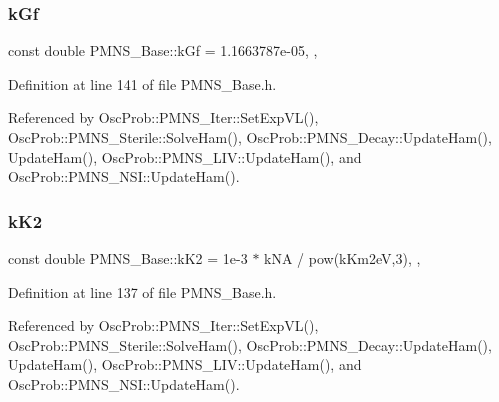 \mbox{\label{classOscProb_1_1PMNS__Base_a7f26a3456128234b2ae6cc9141a6532f}} 
\subsubsection{\texorpdfstring{k\+Gf}{kGf}}
{\footnotesize\ttfamily const double P\+M\+N\+S\+\_\+\+Base\+::k\+Gf = 1.\+1663787e-\/05\hspace{0.3cm}{\ttfamily [static]}, {\ttfamily [protected]}, {\ttfamily [inherited]}}



Definition at line 141 of file P\+M\+N\+S\+\_\+\+Base.\+h.



Referenced by Osc\+Prob\+::\+P\+M\+N\+S\+\_\+\+Iter\+::\+Set\+Exp\+V\+L(), Osc\+Prob\+::\+P\+M\+N\+S\+\_\+\+Sterile\+::\+Solve\+Ham(), Osc\+Prob\+::\+P\+M\+N\+S\+\_\+\+Decay\+::\+Update\+Ham(), Update\+Ham(), Osc\+Prob\+::\+P\+M\+N\+S\+\_\+\+L\+I\+V\+::\+Update\+Ham(), and Osc\+Prob\+::\+P\+M\+N\+S\+\_\+\+N\+S\+I\+::\+Update\+Ham().

\mbox{\label{classOscProb_1_1PMNS__Base_a326fc5016d7dd7ce05682c06cdcb6d94}} 
\subsubsection{\texorpdfstring{k\+K2}{kK2}}
{\footnotesize\ttfamily const double P\+M\+N\+S\+\_\+\+Base\+::k\+K2 = 1e-\/3 $\ast$ k\+N\+A / pow(k\+Km2e\+V,3)\hspace{0.3cm}{\ttfamily [static]}, {\ttfamily [protected]}, {\ttfamily [inherited]}}



Definition at line 137 of file P\+M\+N\+S\+\_\+\+Base.\+h.



Referenced by Osc\+Prob\+::\+P\+M\+N\+S\+\_\+\+Iter\+::\+Set\+Exp\+V\+L(), Osc\+Prob\+::\+P\+M\+N\+S\+\_\+\+Sterile\+::\+Solve\+Ham(), Osc\+Prob\+::\+P\+M\+N\+S\+\_\+\+Decay\+::\+Update\+Ham(), Update\+Ham(), Osc\+Prob\+::\+P\+M\+N\+S\+\_\+\+L\+I\+V\+::\+Update\+Ham(), and Osc\+Prob\+::\+P\+M\+N\+S\+\_\+\+N\+S\+I\+::\+Update\+Ham().

